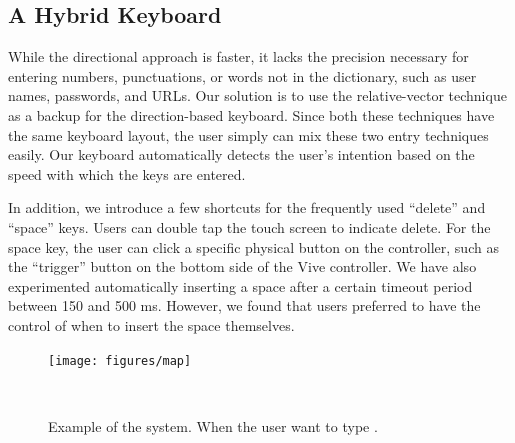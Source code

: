 \subsection{A Hybrid Keyboard}

While the directional approach is faster, it lacks the precision necessary for entering numbers, punctuations, or words not in the dictionary, such as user names, passwords, and URLs.   Our solution is to use the relative-vector technique as a backup for the direction-based keyboard.  Since both these techniques have the same keyboard layout, the user simply can mix these two entry techniques easily.  Our keyboard automatically detects the user's intention based on the speed with which the keys are entered. 

In addition, we introduce a few shortcuts for the frequently used ``delete'' and ``space'' keys.   Users can double tap the touch screen to indicate delete.  For the space key, the user can click a specific physical button on the controller, such as the ``trigger'' button on the bottom side of the Vive controller.  We have also experimented automatically inserting a space after a certain timeout period between 150 and 500 ms.  However, we found that users preferred to have the control of when to insert the space themselves.   

\begin{figure}
  \centering
  \texttt{[image: figures/map]}
  \caption{Example of the system.  When the user want to type .}
  ~\label{fig:example}
\end{figure}

